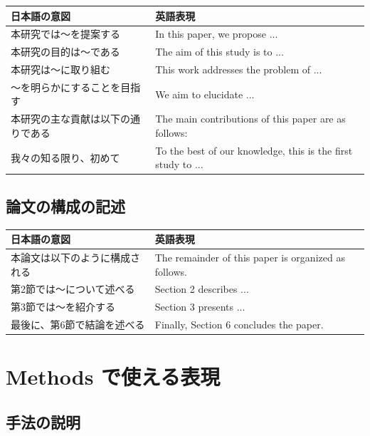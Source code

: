 \begin{table}[H]
\centering
\small
\begin{tabular}{p{4cm}p{6cm}}
\toprule
日本語の意図 & 英語表現 \\
\midrule
本研究では〜を提案する & In this paper, we propose ... \\
本研究の目的は〜である & The aim of this study is to ... \\
本研究は〜に取り組む & This work addresses the problem of ... \\
〜を明らかにすることを目指す & We aim to elucidate ... \\
本研究の主な貢献は以下の通りである & The main contributions of this paper are as follows: \\
我々の知る限り、初めて & To the best of our knowledge, this is the first study to ... \\
\bottomrule
\end{tabular}
\end{table}

\subsection*{論文の構成の記述}

\begin{table}[H]
\centering
\small
\begin{tabular}{p{4cm}p{6cm}}
\toprule
日本語の意図 & 英語表現 \\
\midrule
本論文は以下のように構成される & The remainder of this paper is organized as follows. \\
第2節では〜について述べる & Section 2 describes ... \\
第3節では〜を紹介する & Section 3 presents ... \\
最後に、第6節で結論を述べる & Finally, Section 6 concludes the paper. \\
\bottomrule
\end{tabular}
\end{table}

\section{Methods で使える表現}

\subsection*{手法の説明}

